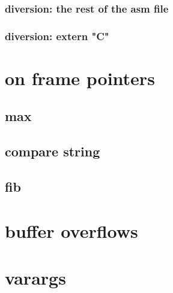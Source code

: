 

\subsubsection{diversion: the rest of the asm file}


\subsubsection{diversion: extern "C"}




\section{on frame pointers}



\subsection{max}







\subsection{compare string}





\subsection{fib}





\section{buffer overflows}



\section{varargs}



